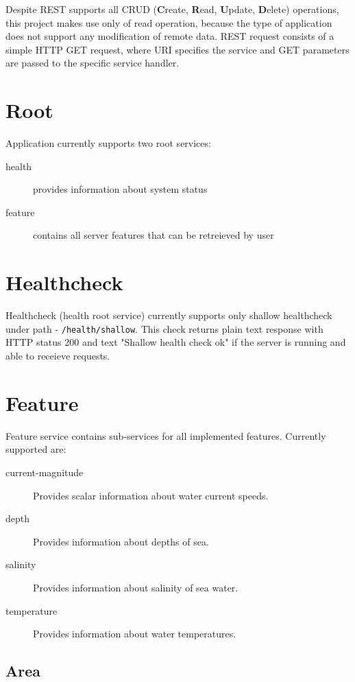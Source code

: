 \documentclass[11pt,a4paper,titlepage,oneside]{report}
\begin{document}
Despite REST supports all CRUD (\textbf{C}reate, \textbf{R}ead, \textbf{U}pdate, \textbf{D}elete) operations, this project makes use only of read operation, because the type of application does not support any modification of remote data. REST request consists of a simple \gls{HTTP} GET request, where URI specifies the service and GET parameters are passed to the specific service handler. \\

\section{Root}

Application currently supports two root services:
\begin{description}
	\item[health] provides information about system status
	\item[feature] contains all server features that can be retreieved by user
\end{description}

\section{Healthcheck}

Healthcheck (health root service) currently supports only shallow healthcheck under path - \texttt{/health/shallow}. This check returns plain text response with \gls{HTTP} status 200 and text "Shallow health check ok" if the server is running and able to receieve requests. \\

\section{Feature}

Feature service contains sub-services for all implemented features. Currently supported are:
\begin{description}
	\item[current-magnitude] Provides scalar information about water current speeds.
	\item[depth] Provides information about depths of sea.
	\item[salinity] Provides information about salinity of sea water.
	\item[temperature] Provides information about water temperatures.
\end{description}

\subsection{Area}
\end{document}
